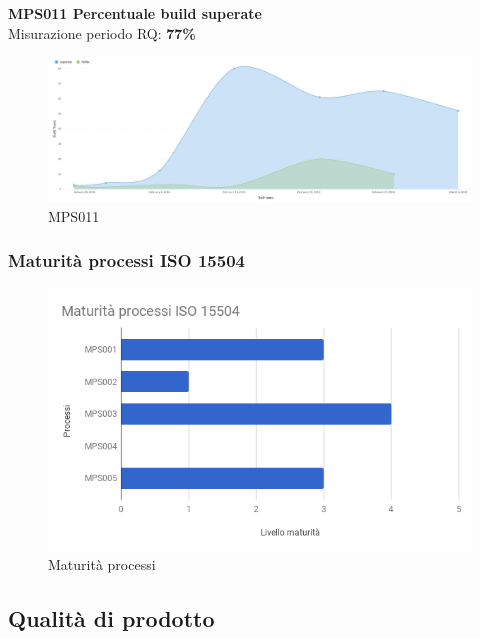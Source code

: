 \documentclass[PianoDiQualifica.tex]{subfiles}
\begin{document}
\newpage
\textbf{MPS011 Percentuale build superate}\\
Misurazione periodo RQ: \textbf{77\%}
\begin{figure}[htb]
	\centering
	\includegraphics[width=1\linewidth]{RP/MPS011}
	\caption{MPS011}
	\label{fig:processi}
\end{figure}

\subsubsection{Maturità processi ISO 15504}
\begin{figure}[htbp]
	\centering
	\includegraphics[width=0.7\linewidth]{RQ/Processi}
	\caption{Maturità processi}
	\label{fig:processi}
\end{figure}


\newpage
\subsection{Qualità di prodotto}
\end{document}
